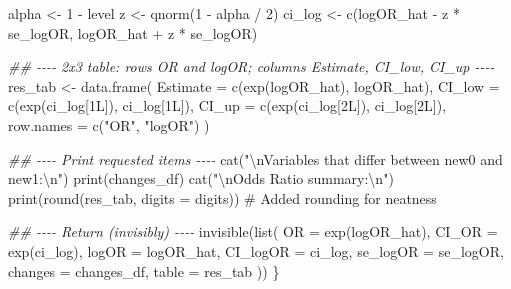 \documentclass[
  letterpaper,
]{scrbook}
\newenvironment{Shaded}{\begin{snugshade}}{\end{snugshade}}
\newcommand{\AttributeTok}[1]{\textcolor[rgb]{0.40,0.45,0.13}{#1}}
\newcommand{\CommentTok}[1]{\textcolor[rgb]{0.37,0.37,0.37}{#1}}
\newcommand{\DecValTok}[1]{\textcolor[rgb]{0.68,0.00,0.00}{#1}}
\newcommand{\DocumentationTok}[1]{\textcolor[rgb]{0.37,0.37,0.37}{\textit{#1}}}
\newcommand{\FunctionTok}[1]{\textcolor[rgb]{0.28,0.35,0.67}{#1}}
\newcommand{\NormalTok}[1]{\textcolor[rgb]{0.00,0.23,0.31}{#1}}
\newcommand{\OtherTok}[1]{\textcolor[rgb]{0.00,0.23,0.31}{#1}}
\newcommand{\SpecialCharTok}[1]{\textcolor[rgb]{0.37,0.37,0.37}{#1}}
\newcommand{\StringTok}[1]{\textcolor[rgb]{0.13,0.47,0.30}{#1}}
\begin{document}
\begin{Shaded}
\begin{Highlighting}[]
\NormalTok{  alpha  }\OtherTok{\textless{}{-}} \DecValTok{1} \SpecialCharTok{{-}}\NormalTok{ level}
\NormalTok{  z      }\OtherTok{\textless{}{-}} \FunctionTok{qnorm}\NormalTok{(}\DecValTok{1} \SpecialCharTok{{-}}\NormalTok{ alpha }\SpecialCharTok{/} \DecValTok{2}\NormalTok{)}
\NormalTok{  ci\_log }\OtherTok{\textless{}{-}} \FunctionTok{c}\NormalTok{(logOR\_hat }\SpecialCharTok{{-}}\NormalTok{ z }\SpecialCharTok{*}\NormalTok{ se\_logOR, logOR\_hat }\SpecialCharTok{+}\NormalTok{ z }\SpecialCharTok{*}\NormalTok{ se\_logOR)}

  \DocumentationTok{\#\# {-}{-}{-}{-} 2x3 table: rows OR and logOR; columns Estimate, CI\_low, CI\_up {-}{-}{-}{-}}
\NormalTok{  res\_tab }\OtherTok{\textless{}{-}} \FunctionTok{data.frame}\NormalTok{(}
    \AttributeTok{Estimate =} \FunctionTok{c}\NormalTok{(}\FunctionTok{exp}\NormalTok{(logOR\_hat),          logOR\_hat),}
    \AttributeTok{CI\_low   =} \FunctionTok{c}\NormalTok{(}\FunctionTok{exp}\NormalTok{(ci\_log[}\DecValTok{1}\NormalTok{L]),         ci\_log[}\DecValTok{1}\NormalTok{L]),}
    \AttributeTok{CI\_up    =} \FunctionTok{c}\NormalTok{(}\FunctionTok{exp}\NormalTok{(ci\_log[}\DecValTok{2}\NormalTok{L]),         ci\_log[}\DecValTok{2}\NormalTok{L]),}
    \AttributeTok{row.names =} \FunctionTok{c}\NormalTok{(}\StringTok{"OR"}\NormalTok{, }\StringTok{"logOR"}\NormalTok{)}
\NormalTok{  )}

  \DocumentationTok{\#\# {-}{-}{-}{-} Print requested items {-}{-}{-}{-}}
  \FunctionTok{cat}\NormalTok{(}\StringTok{"}\SpecialCharTok{\textbackslash{}n}\StringTok{Variables that differ between new0 and new1:}\SpecialCharTok{\textbackslash{}n}\StringTok{"}\NormalTok{)}
  \FunctionTok{print}\NormalTok{(changes\_df)}
  \FunctionTok{cat}\NormalTok{(}\StringTok{"}\SpecialCharTok{\textbackslash{}n}\StringTok{Odds Ratio summary:}\SpecialCharTok{\textbackslash{}n}\StringTok{"}\NormalTok{)}
  \FunctionTok{print}\NormalTok{(}\FunctionTok{round}\NormalTok{(res\_tab, }\AttributeTok{digits =}\NormalTok{ digits)) }\CommentTok{\# Added rounding for neatness}

  \DocumentationTok{\#\# {-}{-}{-}{-} Return (invisibly) {-}{-}{-}{-}}
  \FunctionTok{invisible}\NormalTok{(}\FunctionTok{list}\NormalTok{(}
    \AttributeTok{OR        =} \FunctionTok{exp}\NormalTok{(logOR\_hat),}
    \AttributeTok{CI\_OR     =} \FunctionTok{exp}\NormalTok{(ci\_log),}
    \AttributeTok{logOR     =}\NormalTok{ logOR\_hat,}
    \AttributeTok{CI\_logOR  =}\NormalTok{ ci\_log,}
    \AttributeTok{se\_logOR  =}\NormalTok{ se\_logOR,}
    \AttributeTok{changes   =}\NormalTok{ changes\_df,}
    \AttributeTok{table     =}\NormalTok{ res\_tab}
\NormalTok{  ))}
\NormalTok{\}}


\end{Highlighting}
\end{Shaded}
\end{document}
